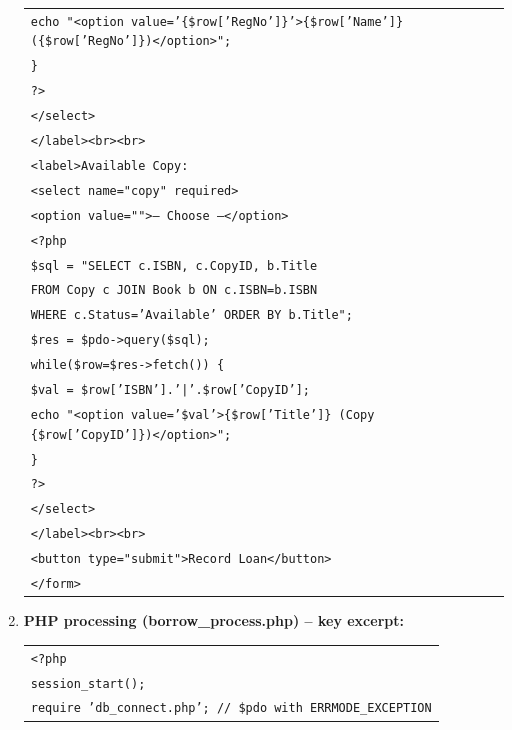 \documentclass[11pt]{article}
\begin{document}
\begin{exoresolu}
\begin{enumerate}
\begin{center}
\begin{tabular}{|l|}
\texttt{\quad\quad\quad\quad echo "<option value='\{\$row['RegNo']\}'>\{\$row['Name']\} (\{\$row['RegNo']\})</option>";} \\
\texttt{\quad\quad\quad \}} \\
\texttt{\quad\quad\quad ?>} \\
\texttt{\quad\quad </select>} \\
\texttt{\quad </label><br><br>} \\
\texttt{\quad <label>Available Copy:} \\
\texttt{\quad\quad <select name="copy" required>} \\
\texttt{\quad\quad\quad <option value="">-- Choose --</option>} \\
\texttt{\quad\quad\quad <?php} \\
\texttt{\quad\quad\quad \$sql = "SELECT c.ISBN, c.CopyID, b.Title} \\
\texttt{\quad\quad\quad\quad FROM Copy c JOIN Book b ON c.ISBN=b.ISBN} \\
\texttt{\quad\quad\quad\quad WHERE c.Status='Available' ORDER BY b.Title";} \\
\texttt{\quad\quad\quad \$res = \$pdo->query(\$sql);} \\
\texttt{\quad\quad\quad while(\$row=\$res->fetch()) \{} \\
\texttt{\quad\quad\quad\quad \$val = \$row['ISBN'].'|'.\$row['CopyID'];} \\
\texttt{\quad\quad\quad\quad echo "<option value='\$val'>\{\$row['Title']\} (Copy \{\$row['CopyID']\})</option>";} \\
\texttt{\quad\quad\quad \}} \\
\texttt{\quad\quad\quad ?>} \\
\texttt{\quad\quad </select>} \\
\texttt{\quad </label><br><br>} \\
\texttt{\quad <button type="submit">Record Loan</button>} \\
\texttt{</form>} \\
\hline
\end{tabular}
\end{center}
\item \textbf{PHP processing (borrow\_process.php) – key excerpt:}
\begin{center}
\begin{tabular}{|l|}
\hline
\texttt{<?php} \\
\texttt{session\_start();} \\
\texttt{require 'db\_connect.php'; // \$pdo with ERRMODE\_EXCEPTION} \\

\end{tabular}
\end{center}
\end{enumerate}
\end{exoresolu}
\end{document}
